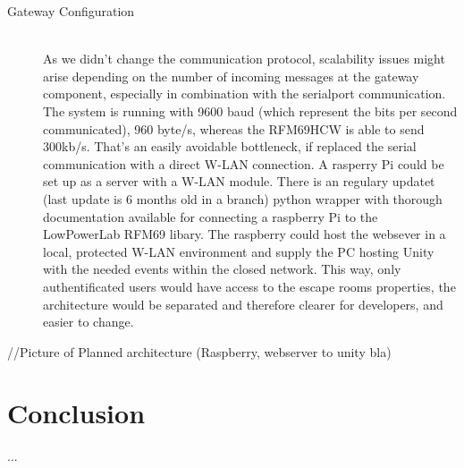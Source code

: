 \begin{description}
    \item[Gateway Configuration]\hfill \\
    As we didn't change the communication protocol, scalability issues might arise depending on the number of incoming messages at the gateway component, 
    especially in combination with the serialport communication. 
    The system is running with 9600 baud (which represent the bits per second communicated), 
    960 byte/s, whereas the RFM69HCW is able to send 300kb/s. 
    That's an easily avoidable bottleneck, if replaced the serial communication with a direct W-LAN connection. 
    A rasperry Pi could be set up as a server with a W-LAN module. There is an regulary updatet (last update is 6 months old in a branch) python wrapper \parencite{raspberryLibRFM} with thorough documentation \parencite{raspberryDoc} available for connecting 
    a raspberry Pi to the LowPowerLab RFM69 libary. 
    The raspberry could host the websever in a local, protected W-LAN environment and 
    supply the PC hosting Unity with the needed events within the closed network. 
    This way, only authentificated users would have access to the escape rooms properties, the architecture would be separated and therefore clearer for developers, and easier to change.
     \parencite{raspberryDoc}
\end{description}
//Picture of Planned architecture (Raspberry, webserver to unity bla)


\section{Conclusion}
...



